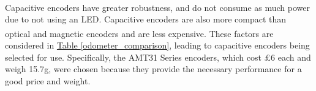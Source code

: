 \documentclass[11pt]{article}		%
\newcommand{\supercite}[1]{\textsuperscript{\cite{#1}}}		%
\newcommand{\tableref}[1]{\hyperref[#1]{Table \ref*{#1}}}     %
\begin{document}
            \\
            \hspace*{2ex}Capacitive encoders have greater robustness, and do not consume as much power due to not using an LED. Capacitive encoders are also more compact than optical and magnetic encoders and are less expensive\supercite{Encoders}. These factors are considered in \tableref{odometer_comparison}, leading to capacitive encoders being selected for use. %
            Specifically, the AMT31 Series encoders, which cost £6 each and weigh 15.7g, were chosen because they provide the necessary performance for a good price and weight. 
                
\end{document}
